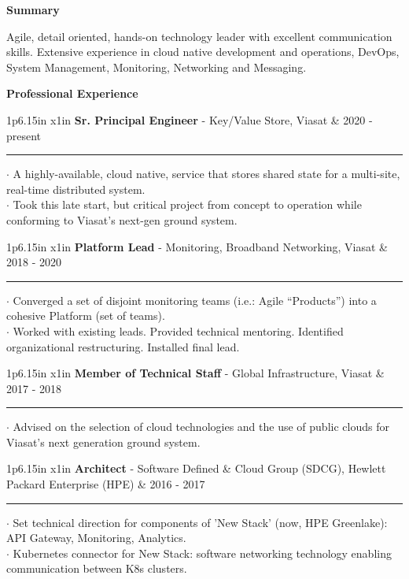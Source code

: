 \documentclass[10pt]{article}
\newcommand{\cvsection}[1]
{
	\begin{center}
		\large\textcolor{sectcol}{\textbf{#1}}
	\end{center}
}
\newcommand{\cveventone}[4]
{

\begin{tabular*}{1\textwidth}{p{6.15in}  x{1in}}
	\textbf{#2} - \textcolor{bgcol}{#3} &   \vspace{2.5pt}\textcolor{sectcol}{#1}
\end{tabular*}

\vspace{-8pt}
\textcolor{softcol}{\hrule}
\vspace{6pt}

  $\cdot$ #4\\[3pt]

}
\newcommand{\cveventtwo}[5]
{

\begin{tabular*}{1\textwidth}{p{6.15in}  x{1in}}
	\textbf{#2} - \textcolor{bgcol}{#3} &   \vspace{2.5pt}\textcolor{sectcol}{#1}
\end{tabular*}

\vspace{-8pt}
\textcolor{softcol}{\hrule}
\vspace{6pt}

  $\cdot$ #4\\[3pt]
  $\cdot$ #5\\[6pt]

}
\begin{document}
\normalsize

\vspace{-6pt}
\cvsection{Summary}
Agile, detail oriented, hands-on technology leader with excellent
communication skills.  Extensive experience in cloud native
development and operations, DevOps, System Management, Monitoring,
Networking and Messaging.

%
%

\cvsection{Professional Experience}

\cveventtwo{2020 - present}{Sr. Principal Engineer}{Key/Value Store, Viasat}
{A highly-available, cloud native, service that stores shared state for a multi-site, real-time distributed system.}
{Took this late start, but critical project from concept to operation while conforming to Viasat's next-gen ground system.}

\cveventtwo{2018 - 2020}{Platform Lead}{Monitoring, Broadband Networking, Viasat}
{Converged a set of disjoint monitoring teams (i.e.: Agile ``Products'') into a cohesive Platform (set of teams).}
{Worked with existing leads. Provided technical mentoring. Identified organizational restructuring. Installed final lead.}

%
\cveventone{2017 - 2018}{Member of Technical Staff}{Global Infrastructure, Viasat}
{Advised on the selection of cloud technologies and the use of public clouds for Viasat's next
 generation ground system.}

%
\cveventtwo{2016 - 2017}{Architect}{Software Defined \& Cloud Group (SDCG), Hewlett Packard Enterprise (HPE)}
{Set technical direction for components of 'New Stack' (now, HPE Greenlake): API Gateway, Monitoring, Analytics.}
{Kubernetes connector for New Stack: software networking technology enabling communication between K8s clusters.}

\end{document}
